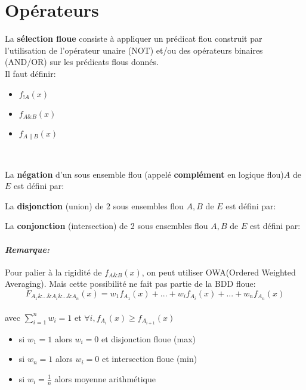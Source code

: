\documentclass[a4paper,11pt]{article}
\begin{document}
\section{Opérateurs}
La \textbf{sélection floue} consiste à appliquer un prédicat flou construit par l’utilisation de l'opérateur unaire (NOT) et/ou des opérateurs binaires (AND/OR) sur les prédicats flous donnés.\\

Il faut définir:
\begin{itemize}
	\item$f_{!A}(x)$	
	\item$f_{A\&B}(x)$
	\item$f_{A\|B}(x)$
\end{itemize} 
~

La \textbf{négation} d'un sous ensemble flou (appelé \textbf{complément} en logique flou)$A$ de $E$ est défini par: \begin{center}  \end{center}

La \textbf{disjonction} (union) de 2 sous ensembles flou $A,B$ de $E$ est défini par: \begin{center}  \end{center}

La \textbf{conjonction} (intersection) de 2 sous ensembles flou $A,B$ de $E$ est défini par: \begin{center}  \end{center}

\paragraph{\emph{Remarque:}}
Pour palier à la rigidité de $f_{A\&B}(x)$, on peut utiliser OWA(Ordered Weighted Averaging). Mais cette possibilité ne fait pas partie de la BDD floue:
$$ F_{A_1\&...\&A_i\&...\&A_n}(x)=w_1f_{A_1}(x)+...+w_if_{A_i}(x)+...+w_nf_{A_n}(x)$$
\\

avec $\sum_{i=1}^{n} w_i=1$ et $\forall i,f_{A_i}(x)\geq f_{A_{i+1}}(x)$

\begin{itemize}
	\item si $w_1=1$ alors $w_i=0$ et disjonction floue (max)
	\item si $w_n=1$ alors $w_i=0$ et intersection floue (min)
	\item si $w_i=\frac{1}{n}$ alors moyenne arithmétique
\end{itemize}
\end{document}
